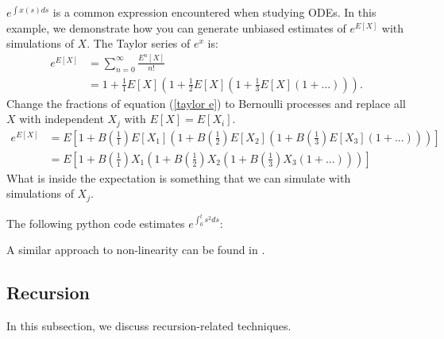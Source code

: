 \documentclass[a4paper,12pt]{article}
\begin{document}
\begin{example}[$e^{E[X]}$] \label{ex:exp int}
    $e^{\int x(s)ds}$ is a common expression encountered when studying ODEs.
    In this example, we demonstrate how you can generate unbiased estimates of
    $e^{E[X]}$ with simulations of $X$. The Taylor series of $e^{x}$ is:
    \begin{align}
        e^{E[X]} & = \sum_{n=0}^{\infty} \frac{E^{n}[X]}{n!}     \\
                 & = 1 + \frac{1}{1}E[X]\left(1+ \frac{1}{2}E[X]
        \left(1+\frac{1}{3}E[X]\left(1+ ...\right)\right)\right). \label{taylor e}
    \end{align}
    Change the fractions of equation (\ref{taylor e}) to Bernoulli processes
    and replace all $X$ with independent $X_j$ with $E[X]=E[X_{i}]$.
    \begin{align}
        e^{E[X]} & = E
        \left[1 + B\left(\frac{1}{1}\right)E[X_1]
        \left(1+ B\left(\frac{1}{2}\right)E[X_2]
        \left(1+B\left(\frac{1}{3}\right)E[X_3]
        \left(1+ ...\right)
        \right)
        \right)
        \right]              \\
                 & = E\left[
            1 + B\left(\frac{1}{1}\right)X_1
            \left(1+ B\left(\frac{1}{2}\right)X_2
            \left(1+B\left(\frac{1}{3}\right)X_3
            \left(1+ ...\right)
            \right)
            \right)
            \right]
    \end{align}
    What is inside the expectation is something that we can simulate with simulations of $X_{j}$.
\end{example}

\vspace{0.2cm}
\begin{pythonn}
    The following python code estimates $e^{\int_{0}^{t} s^{2}ds}$:
    \vspace*{0.4cm}
\end{pythonn}

\begin{related}
    A similar approach to non-linearity can be found in \cite{ermakov_monte_2019}.
\end{related}

\subsection{Recursion}
In this subsection, we discuss recursion-related techniques.
\end{document}
